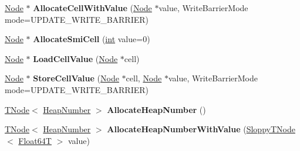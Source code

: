 \begin{DoxyCompactItemize}
\mbox{\hyperlink{classv8_1_1internal_1_1compiler_1_1Node}{Node}} $\ast$ {\bfseries Allocate\+Cell\+With\+Value} (\mbox{\hyperlink{classv8_1_1internal_1_1compiler_1_1Node}{Node}} $\ast$value, Write\+Barrier\+Mode mode=U\+P\+D\+A\+T\+E\+\_\+\+W\+R\+I\+T\+E\+\_\+\+B\+A\+R\+R\+I\+ER)
\item 
\mbox{\label{classv8_1_1internal_1_1CodeStubAssembler_aed2ef7233a1f545c6cc0e9df692cb940}} 
\mbox{\hyperlink{classv8_1_1internal_1_1compiler_1_1Node}{Node}} $\ast$ {\bfseries Allocate\+Smi\+Cell} (\mbox{\hyperlink{classint}{int}} value=0)
\item 
\mbox{\label{classv8_1_1internal_1_1CodeStubAssembler_a80549213f35628ec49d81560cb6036e7}} 
\mbox{\hyperlink{classv8_1_1internal_1_1compiler_1_1Node}{Node}} $\ast$ {\bfseries Load\+Cell\+Value} (\mbox{\hyperlink{classv8_1_1internal_1_1compiler_1_1Node}{Node}} $\ast$cell)
\item 
\mbox{\label{classv8_1_1internal_1_1CodeStubAssembler_a1844a4d120a3a5d9a2e23d6fd7d71dd6}} 
\mbox{\hyperlink{classv8_1_1internal_1_1compiler_1_1Node}{Node}} $\ast$ {\bfseries Store\+Cell\+Value} (\mbox{\hyperlink{classv8_1_1internal_1_1compiler_1_1Node}{Node}} $\ast$cell, \mbox{\hyperlink{classv8_1_1internal_1_1compiler_1_1Node}{Node}} $\ast$value, Write\+Barrier\+Mode mode=U\+P\+D\+A\+T\+E\+\_\+\+W\+R\+I\+T\+E\+\_\+\+B\+A\+R\+R\+I\+ER)
\item 
\mbox{\label{classv8_1_1internal_1_1CodeStubAssembler_a1d92aaa929df5fc5edce6f027df01e72}} 
\mbox{\hyperlink{classv8_1_1internal_1_1compiler_1_1TNode}{T\+Node}}$<$ \mbox{\hyperlink{classv8_1_1internal_1_1HeapNumber}{Heap\+Number}} $>$ {\bfseries Allocate\+Heap\+Number} ()
\item 
\mbox{\label{classv8_1_1internal_1_1CodeStubAssembler_a8d92312a7ccc18829e783056fe7ff461}} 
\mbox{\hyperlink{classv8_1_1internal_1_1compiler_1_1TNode}{T\+Node}}$<$ \mbox{\hyperlink{classv8_1_1internal_1_1HeapNumber}{Heap\+Number}} $>$ {\bfseries Allocate\+Heap\+Number\+With\+Value} (\mbox{\hyperlink{classv8_1_1internal_1_1compiler_1_1SloppyTNode}{Sloppy\+T\+Node}}$<$ \mbox{\hyperlink{structv8_1_1internal_1_1Float64T}{Float64T}} $>$ value)

\end{DoxyCompactItemize}
